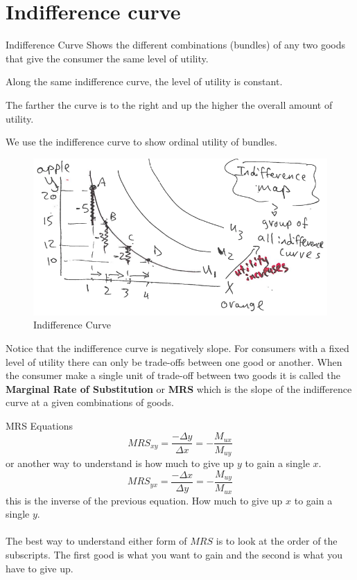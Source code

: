 \documentclass[../ECON-281-Notes.tex]{subfiles}
\begin{document}
\section{Indifference curve}
\begin{Definition}
  {Indifference Curve}
  Shows the different combinations (bundles) of any two goods that give the consumer the same level of utility.
  
  Along the same indifference curve, the level of utility is constant.

  The farther the curve is to the right and up the higher the overall amount of utility.

  We use the indifference curve to show ordinal utility of bundles.
\end{Definition}
\begin{figure}[!h]
  \centering
  \includegraphics[width=0.8\columnwidth]{../assets/indifference_curve.png}
  \caption{Indifference Curve}
  \label{fig:assets-indifference_curve-png}
\end{figure}

Notice that the indifference curve is negatively slope. For consumers with a fixed level of utility there can only be trade-offs between one good or another. 
When the consumer make a single unit of trade-off between two goods it is called the \textbf{Marginal Rate of Substitution} or \textbf{MRS} which is the slope of the indifference curve at a given combinations of goods.

\begin{DndSidebar}[color=PhbLightGreen]{MRS Equations}
  \begin{equation}
    MRS_{xy} = \frac{-\Delta y}{\Delta x} = -\frac{M_{ux}}{M_{uy}}    
  \end{equation}
  or another way to understand is how much to give up $y$ to gain a single $x$. 
  \begin{equation}
    MRS_{yx} = \frac{-\Delta x}{\Delta y} = -\frac{M_{uy}}{M_{ux}}
  \end{equation}
  this is the inverse of the previous equation. How much to give up $x$ to gain a single $y$.
  \\~\\
  The best way to understand either form of $MRS$ is to look at the order of the subscripts. The first good is what you want to gain and the second is what you have to give up. 
\end{DndSidebar}
\end{document}
